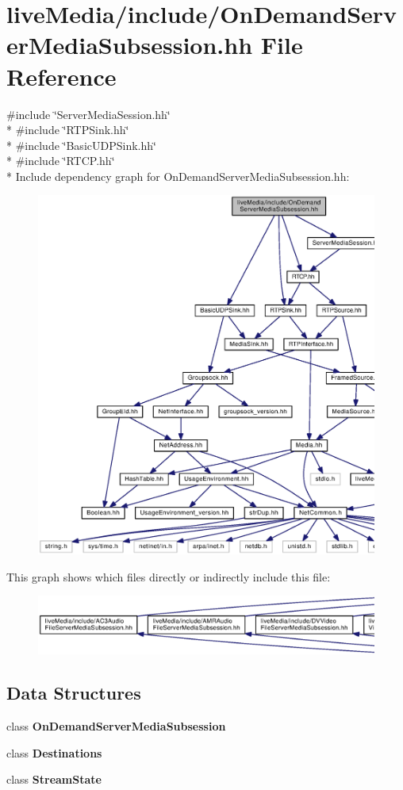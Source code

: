\section{live\+Media/include/\+On\+Demand\+Server\+Media\+Subsession.hh File Reference}
\label{OnDemandServerMediaSubsession_8hh}
{\ttfamily \#include \char`\"{}Server\+Media\+Session.\+hh\char`\"{}}\\*
{\ttfamily \#include \char`\"{}R\+T\+P\+Sink.\+hh\char`\"{}}\\*
{\ttfamily \#include \char`\"{}Basic\+U\+D\+P\+Sink.\+hh\char`\"{}}\\*
{\ttfamily \#include \char`\"{}R\+T\+C\+P.\+hh\char`\"{}}\\*
Include dependency graph for On\+Demand\+Server\+Media\+Subsession.\+hh\+:
\nopagebreak
\begin{figure}[H]
\begin{center}
\leavevmode
\includegraphics[width=350pt]{OnDemandServerMediaSubsession_8hh__incl}
\end{center}
\end{figure}
This graph shows which files directly or indirectly include this file\+:
\nopagebreak
\begin{figure}[H]
\begin{center}
\leavevmode
\includegraphics[width=350pt]{OnDemandServerMediaSubsession_8hh__dep__incl}
\end{center}
\end{figure}
\subsection*{Data Structures}
\begin{DoxyCompactItemize}
\item 
class {\bf On\+Demand\+Server\+Media\+Subsession}
\item 
class {\bf Destinations}
\item 
class {\bf Stream\+State}
\end{DoxyCompactItemize}
